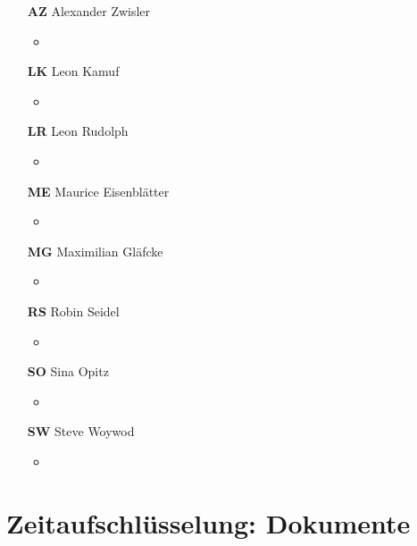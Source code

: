 \documentclass[11pt,a4paper]{report}
\begin{document}
\begin{itemize}
\item[\textbf{AZ}] Alexander Zwisler
	\begin{itemize}
		\item 
	\end{itemize}
\item[\textbf{LK}] Leon Kamuf
	\begin{itemize}
		\item
	\end{itemize}
\item[\textbf{LR}] Leon Rudolph
	\begin{itemize}
		\item
	\end{itemize}
\item[\textbf{ME}] Maurice Eisenblätter
	\begin{itemize}
		\item
	\end{itemize}
\item[\textbf{MG}] Maximilian Gläfcke
	\begin{itemize}
		\item
	\end{itemize}
\item[\textbf{RS}] Robin Seidel
	\begin{itemize}
		\item
	\end{itemize}
\item[\textbf{SO}] Sina Opitz
	\begin{itemize}
		\item
	\end{itemize}
\item[\textbf{SW}] Steve Woywod
	\begin{itemize}
		\item
	\end{itemize}
\end{itemize}

\newpage

\section{Zeitaufschlüsselung: Dokumente}

\end{document}
